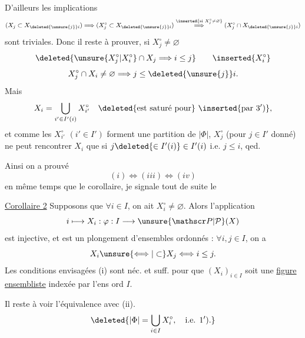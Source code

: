 D'ailleurs les implications
\[
(X_j\subset X_{\deleted{\unsure{j}}i})\Longrightarrow(X_j^{\circ}\subset X_{\deleted{\unsure{j}}i})\overset{\inserted{\text{si }X_j^{\circ}\ne\varnothing}}{\Longrightarrow}(X_j^{\circ}\cap X_{\deleted{\unsure{j}}i})
\]
sont triviales. Donc il reste à prouver, si $X_j^{\circ}\ne\varnothing$
\[
\deleted{\unsure{X_j^{\circ}|X_i^{\circ}}\cap X_j\Longrightarrow i\leq j}\qquad\inserted{X_i^{\circ}}
\]
\[
X_j^{\circ}\cap X_i\ne\varnothing\Longrightarrow j\leq\deleted{\unsure{j}}i.
\]
Mais
\[
X_i=\bigcup_{i'\in I'(i)}X_{i'}^{\circ}\quad\deleted{\text{est saturé pour}}\ \inserted{\text{par }3')},
\]
et comme les $X_{i'}^{\circ}$ $(i'\in I')$ forment une partition de $|\Phi|$,  $X_j^{\circ}$ (pour $j\in I'$ donné) ne peut rencontrer $X_i$ que si $j\deleted{\in I'(i)}\in I'(i)$ i.e. $j\leq i$, qed.

Ainsi on a prouvé
\[
(i)\Longleftrightarrow(iii)\Longleftrightarrow(iv)
\]
en même temps que le corollaire,  je signale tout de suite le

\uline{Corollaire 2} Supposons  que $\forall i\in I$, on ait $X_i^{\circ}\ne\varnothing$.
Alors l'application
\[
i\longmapsto X_i:\varphi:I\longrightarrow\unsure{\mathscr P|\mathcal P}(X)
\]
est injective, et est un plongement d'ensembles ordonnés : $\forall i,j\in I$, on a
\[
X_i\unsure{\Longleftrightarrow|\subset}X_j\Longleftrightarrow i\leq j.
\]
 Les conditions envisagées (i)   sont  néc. et suff. pour que   $(X_i)_{i\in I}$  soit une \uline{figure ensembliste} indexée par l'ens ord $I$.

Il reste à voir l'équivalence avec (ii).
\[
\deleted{|\Phi|=\bigcup_{i\in I}X_i^{\circ},\quad\text{i.e. }1').}
\]
